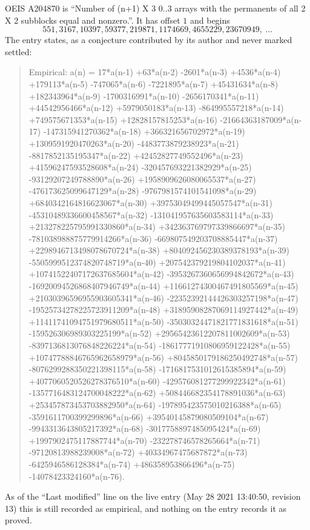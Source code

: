 \documentclass[11pt,a4paper]{article}
\theoremstyle{plain}
\theoremstyle{definition}
\begin{document}
OEIS A204870 is ``Number of (n+1) X 3 0..3 arrays with the permanents of all 2 X 2 subblocks equal and nonzero.''. It has offset $1$ and begins
\[
551, 3167, 10397, 59377, 219871, 1174669, 4655229, 23670949,\ \dots
\]
The entry states, as a conjecture contributed by its author and never marked settled:
\begin{quote}
Empirical: a(n) = 17*a(n-1) +63*a(n-2) -2601*a(n-3) +4536*a(n-4) +179113*a(n-5) -747065*a(n-6) -7221895*a(n-7) +45431634*a(n-8) +182343964*a(n-9) -1700316991*a(n-10) -2656170341*a(n-11) +44542956466*a(n-12) +5979050183*a(n-13) -864995557218*a(n-14) +749575671353*a(n-15) +12828157815253*a(n-16) -21664363187009*a(n-17) -147315941270362*a(n-18) +366321656702972*a(n-19) +1309591920470263*a(n-20) -4483773879238923*a(n-21) -8817852135195347*a(n-22) +42452827749552496*a(n-23) +41596247593528608*a(n-24) -320457693221382929*a(n-25) -93129207249788890*a(n-26) +1958909626080065537*a(n-27) -476173625099647129*a(n-28) -9767981574101541098*a(n-29) +6840342164816623067*a(n-30) +39753049499445057547*a(n-31) -45310489336600458567*a(n-32) -131041957635603583114*a(n-33) +213278225795991330860*a(n-34) +342363769797339866697*a(n-35) -781038988875779914266*a(n-36) -669807549203708885447*a(n-37) +2298946713498078670724*a(n-38) +804092456230389378193*a(n-39) -5505999512374820748719*a(n-40) +207542379219804102037*a(n-41) +10741522407172637685604*a(n-42) -3953267360656994842672*a(n-43) -16920094526868407946749*a(n-44) +11661274300467491805569*a(n-45) +21030396596955903605341*a(n-46) -22352392144426303257198*a(n-47) -19525734278225723911209*a(n-48) +31895908287069114927442*a(n-49) +11411741094751979680511*a(n-50) -35030324471821771831618*a(n-51) -159526306989303225199*a(n-52) +29565423612207811002609*a(n-53) -8397136813076848226224*a(n-54) -18617771910806959122428*a(n-55) +10747788846765962658979*a(n-56) +8045850179186250492748*a(n-57) -8076299288350221398115*a(n-58) -1716817531012615385894*a(n-59) +4077060520526278376510*a(n-60) -429576081277299922342*a(n-61) -1357716483124700048222*a(n-62) +508446682354178891036*a(n-63) +253457873453703882950*a(n-64) -197895423575010216388*a(n-65) -3591611700399299896*a(n-66) +39540145879080509104*a(n-67) -9943313643805217392*a(n-68) -3017758897485095424*a(n-69) +1997902475117887744*a(n-70) -232278746578265664*a(n-71) -97120813988239008*a(n-72) +40334967475687872*a(n-73) -6425946586128384*a(n-74) +486358953866496*a(n-75) -14078423324160*a(n-76).
\end{quote}
As of the ``Last modified'' line on the live entry (May 28 2021 13:40:50, revision 13) this is still
recorded as empirical, and nothing on the entry records it as proved.
\end{document}
